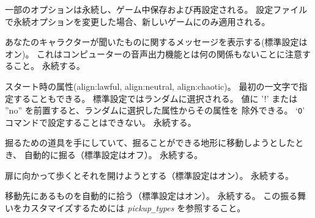 一部のオプションは永続し、ゲーム中保存および再設定される。
設定ファイルで永続オプションを変更した場合、新しいゲームにのみ適用される。

\blist{}
\item[\ib{acoustics}]
あなたのキャラクターが聞いたものに関するメッセージを表示する(標準設定はオン)。
これはコンピューターの音声出力機能とは何の関係もないことに注意すること。
永続する。
\item[\ib{align}]
スタート時の属性(align:lawful, align:neutral, align:chaotic)。
最初の一文字で指定することもできる。
標準設定ではランダムに選択される。
値に '!' または ''no'' を前置すると、ランダムに選択した属性からその属性を
除外できる。
`{\tt O}' コマンドで設定することはできない。
永続する。
\item[\ib{autodig}]
掘るための道具を手にしていて、掘ることができる地形に移動しようとしたとき、
自動的に掘る（標準設定はオフ）。
永続する。
\item[\ib{autoopen}]
扉に向かって歩くとそれを開けようとする（標準設定はオン）。
永続する。
\item[\ib{autopickup}]
移動先にあるものを自動的に拾う（標準設定はオン）。
永続する。
この振る舞いをカスタマイズするためには
{\it pickup\verb+_+types\/} を参照すること。
\item[\ib{autoquiver}]
